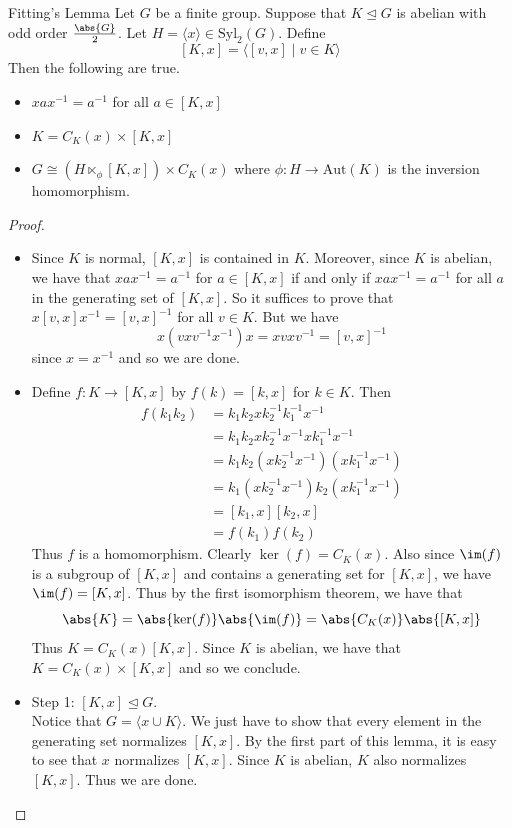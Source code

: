 \documentclass[a4paper]{article}
\begin{document}
\begin{lmm}{Fitting's Lemma}{} Let $G$ be a finite group. Suppose that $K\trianglelefteq G$ is abelian with odd order $\frac{\abs{G}}{2}$. Let $H=\langle x\rangle\in\text{Syl}_2(G)$. Define $$[K,x]=\langle[v,x]\;|\;v\in K\rangle$$ Then the following are true. 
\begin{itemize}
\item $xax^{-1}=a^{-1}$ for all $a\in[K,x]$
\item $K=C_K(x)\times[K,x]$
\item $G\cong(H\ltimes_\phi[K,x])\times C_K(x)$ where $\phi:H\to\text{Aut}(K)$ is the inversion homomorphism. 
\end{itemize} 
\begin{proof}~\\
\begin{itemize}
\item Since $K$ is normal, $[K,x]$ is contained in $K$. Moreover, since $K$ is abelian, we have that $xax^{-1}=a^{-1}$ for $a\in[K,x]$ if and only if $xax^{-1}=a^{-1}$ for all $a$ in the generating set of $[K,x]$. So it suffices to prove that $x[v,x]x^{-1}=[v,x]^{-1}$ for all $v\in K$. But we have $$x(vxv^{-1}x^{-1})x=xvxv^{-1}=[v,x]^{-1}$$ since $x=x^{-1}$ and so we are done. 
\item Define $f:K\to[K,x]$ by $f(k)=[k,x]$ for $k\in K$. Then 
\begin{align*}
f(k_1k_2)&=k_1k_2xk_2^{-1}k_1^{-1}x^{-1}\\
&=k_1k_2xk_2^{-1}x^{-1}xk_1^{-1}x^{-1}\\
&=k_1k_2(xk_2^{-1}x^{-1})(xk_1^{-1}x^{-1})\\
&=k_1(xk_2^{-1}x^{-1})k_2(xk_1^{-1}x^{-1})\tag{$K$ is abelian}\\
&=[k_1,x][k_2,x]\\
&=f(k_1)f(k_2)
\end{align*}
Thus $f$ is a homomorphism. Clearly $\ker(f)=C_K(x)$. Also since $\im(f)$ is a subgroup of $[K,x]$ and contains a generating set for $[K,x]$, we have $\im(f)=[K,x]$. Thus by the first isomorphism theorem, we have that $$\abs{K}=\abs{\ker(f)}\abs{\im(f)}=\abs{C_K(x)}\abs{[K,x]}$$ Thus $K=C_K(x)[K,x]$. Since $K$ is abelian, we have that $K=C_K(x)\times[K,x]$ and so we conclude. 
\item Step 1: $[K,x]\trianglelefteq G$. \\
Notice that $G=\langle x\cup K\rangle$. We just have to show that every element in the generating set normalizes $[K,x]$. By the first part of this lemma, it is easy to see that $x$ normalizes $[K,x]$. Since $K$ is abelian, $K$ also normalizes $[K,x]$. Thus we are done. 
\end{itemize}
\end{proof}
\end{lmm}
\end{document}
